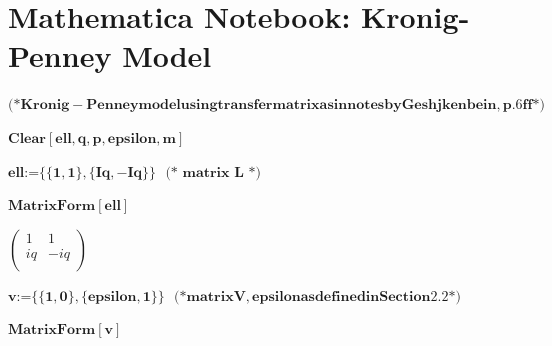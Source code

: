 

\chapter{Mathematica Notebook: Kronig-Penney Model}{\label{Mathematica File: Kronig-Penney Model}


\begin{doublespace}
\noindent\(\pmb{\text{(*} \text{Kronig}-\text{Penney} \text{model} \text{using} \text{transfer} \text{matrix} \text{as} \text{in} \text{notes} \text{by}
\text{Geshjkenbein}, p.6 \text{ff} \text{*)}}\)
\end{doublespace}

\begin{doublespace}
\noindent\(\pmb{\text{Clear}[\text{ell},q,p,\text{epsilon},m]\text{     }}\)
\end{doublespace}

\begin{doublespace}
\noindent\(\pmb{\text{ell}\text{:=}\{\{1,1\},\{I q, -I q\}\}\text{      }\text{(* matrix L *)}}\)
\end{doublespace}

\begin{doublespace}
\noindent\(\pmb{\text{MatrixForm}[\text{ell}]}\)
\end{doublespace}

\begin{doublespace}
\noindent\(\left(
\begin{array}{cc}
 1 & 1 \\
 i q & -i q \\
\end{array}
\right)\)
\end{doublespace}

\begin{doublespace}
\noindent\(\pmb{v\text{:=}\{\{1,0\},\{\text{epsilon}, 1\}\}\text{    }\text{(*} \text{matrix} V, \text{epsilon} \text{as} \text{defined} \text{in}
\text{Section} 2.2 \text{*)}}\)
\end{doublespace}

\begin{doublespace}
\noindent\(\pmb{\text{MatrixForm}[v]}\)
\end{doublespace}

}
